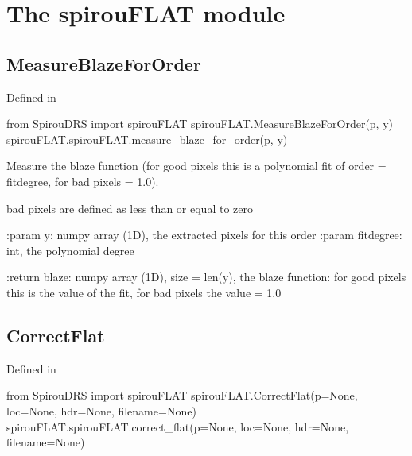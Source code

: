 
\clearpage
\newpage
\noindent\begin{minipage}{\textwidth}
\section{The spirouFLAT module}
\label{ch:the_module:spirouFLAT}

\subsection{MeasureBlazeForOrder}

Defined in \spirouFLAT{}

\begin{pythonbox}
from SpirouDRS import spirouFLAT
spirouFLAT.MeasureBlazeForOrder(p, y)
spirouFLAT.spirouFLAT.measure_blaze_for_order(p, y)
\end{pythonbox}

\begin{pythondocstring}
Measure the blaze function (for good pixels this is a polynomial fit of
order = fitdegree, for bad pixels = 1.0).

bad pixels are defined as less than or equal to zero

:param y: numpy array (1D), the extracted pixels for this order
:param fitdegree: int, the polynomial degree

:return blaze: numpy array (1D), size = len(y), the blaze function: for
               good pixels this is the value of the fit, for bad pixels the
               value = 1.0
\end{pythondocstring}
\end{minipage}


\subsection{CorrectFlat}

Defined in \spirouFLAT{}

\begin{pythonbox}
from SpirouDRS import spirouFLAT
spirouFLAT.CorrectFlat(p=None, loc=None, hdr=None, filename=None)
spirouFLAT.spirouFLAT.correct_flat(p=None, loc=None, hdr=None, filename=None)
\end{pythonbox}

